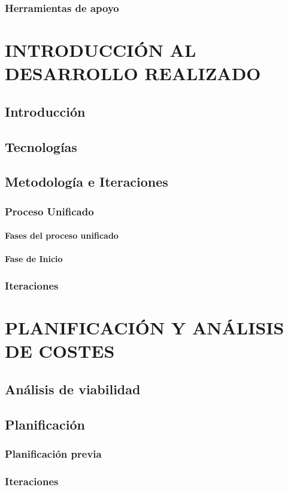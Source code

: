 \documentclass[12pt, a4paper, twoside]{book}
\begin{document}
	\subsection{Herramientas de apoyo}
	\chapter{INTRODUCCIÓN AL DESARROLLO REALIZADO}
	\section{Introducción}
	\section{Tecnologías}
	\section{Metodología e Iteraciones}
	\subsection{Proceso Unificado}
	\subsubsection{Fases del proceso unificado}
	\subsubsection{Fase de Inicio}
	\subsection{Iteraciones}
	\chapter{PLANIFICACIÓN Y ANÁLISIS DE COSTES}
	\section{Análisis de viabilidad}
	\section{Planificación}
	\subsection{Planificación previa}
	\subsection{Iteraciones}
\end{document}
